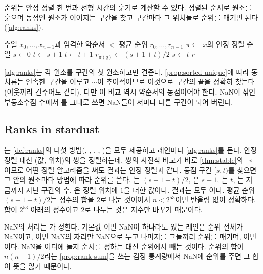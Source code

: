 순위는 안정 정렬 한 번과 선형 시간의 훑기로 계산할 수 있다. 정렬된 순서로 원소를 훑으며 동점인 원소가 이어지는 구간을 찾고 구간마다 그 위치들로 순위를 매기면 된다(\cref{alg:ranks}).

\begin{algorithm}[htbp]
\begin{algorithmic}[1]
\Require 수열 $x_0,\dots,x_{n-1}$과 엄격한 약순서 $<$
\Ensure 평균 순위 $r_0,\dots,r_{n-1}$
\State $\pi\gets$ $x$의 안정 정렬 순열 
\State $s\gets0$
  \State $t\gets s+1$
   
    \State $t\gets t+1$
  \EndWhile
   
    \State $r_{\pi(q)}\gets(s+1+t)/2$
  \EndFor
  \State $s\gets t$
\EndWhile
\State \Return $r$
\end{algorithmic}
\caption{안정 정렬을 이용한 평균 순위의 계산}
\label{alg:ranks}
\end{algorithm}

\cref{alg:ranks}는 각 원소를 구간의 첫 원소하고만 견준다. \cref{prop:sorted-unique}에 따라 동치류는 연속한 구간을 이루고 $\sim$이 추이적이므로 이것으로 구간의 끝을 정확히 찾는다(이웃끼리 견주어도 같다). 다만 이 비교 역시 약순서의 동점이어야 한다. NaN이 섞인 부동소수점 수에서 \code{==}를 그대로 쓰면 NaN들이 저마다 다른 구간이 되어 버린다.

\subsection{Ranks in stardust}

는 \cref{def:ranks}의 다섯 방법(, , , , )을 모두 제공하고 레인마다 \cref{alg:ranks}를 돈다. 안정 정렬 대신 (값, 위치)의 쌍을 정렬하는데, 쌍의 사전식 비교가 바로 \cref{thm:stable}의 $\prec$이므로 어떤 정렬 알고리즘을 써도 결과는 안정 정렬과 같다. 동점 구간 $[s,t)$를 찾으면 그 안의 원소마다 방법에 따라 순위를 쓴다. 는 $(s+1+t)/2$, 은 $s+1$, 는 $t$, 는 지금까지 지난 구간의 수, 은 정렬 위치에 $1$을 더한 값이다. 결과는 모두 이다. 평균 순위 $(s+1+t)/2$는 정수의 합을 $2$로 나눈 것이어서 $n<2^{53}$이면 반올림 없이 정확하다. 합이 $2^{53}$ 아래의 정수이고 $2$로 나누는 것은 지수만 바꾸기 때문이다.

NaN의 처리는 가 정한다. 기본값 이면 NaN이 하나라도 있는 레인은 순위 전체가 NaN이고, 이면 NaN의 자리만 NaN으로 두고 나머지를 그들끼리 순위를 매기며, 이면 이다. NaN을 어디에 둘지 순서를 정하는 대신 순위에서 빼는 것이다. 순위의 합이 $n(n+1)/2$라는 \cref{prop:rank-sum}을 쓰는 검정 통계량에서 NaN에 순위를 주면 그 합이 뜻을 잃기 때문이다.

